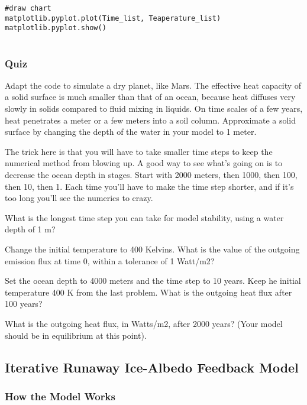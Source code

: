 {\begin{code}[흑체 복사평형 온도]
\begin{lstlisting}
#draw chart
matplotlib.pyplot.plot(Time_list, Teaperature_list)
matplotlib.pyplot.show()
	
	\end{lstlisting}
\end{code}

\subsubsection{Quiz}\index{}
Adapt the code to simulate a dry planet, like Mars. The effective heat capacity of a solid surface is much smaller than that of an ocean, because heat diffuses very slowly in solids compared to fluid mixing in liquids. On time scales of a few years, heat penetrates a meter or a few meters into a soil column. Approximate a solid surface by changing the depth of the water in your model to 1 meter.

The trick here is that you will have to take smaller time steps to keep the numerical method from blowing up. A good way to see what's going on is to decrease the ocean depth in stages. Start with 2000 meters, then 1000, then 100, then 10, then 1. Each time you'll have to make the time step shorter, and if it's too long you'll see the numerics to crazy.

What is the longest time step you can take for model stability, using a water depth of 1 m?



Change the initial temperature to 400 Kelvins. What is the value of the outgoing emission flux at time 0, within a tolerance of 1 Watt/m2?



Set the ocean depth to 4000 meters and the time step to 10 years. Keep he initial temperature 400 K from the last problem. What is the outgoing heat flux after 100 years?



What is the outgoing heat flux, in Watts/m2, after 2000 years? (Your model should be in equilibrium at this point).




\subsection{Iterative Runaway Ice-Albedo Feedback Model}

\subsubsection{How the Model Works}\index{}

}
